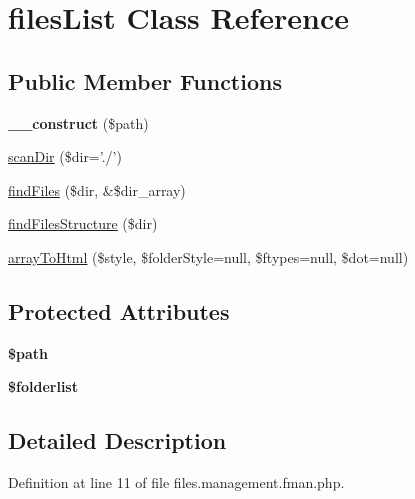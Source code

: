 \hypertarget{classfiles_list}{\section{files\-List Class Reference}
\label{classfiles_list}
}
\subsection*{Public Member Functions}
\begin{DoxyCompactItemize}
\item 
\hypertarget{classfiles_list_a03853ceaa393e487835b287de58aba5a}{{\bfseries \-\_\-\-\_\-construct} (\$path)}\label{classfiles_list_a03853ceaa393e487835b287de58aba5a}

\item 
\hyperlink{classfiles_list_a3593ec13e3e24737585badced66b43e1}{scan\-Dir} (\$dir='./')
\item 
\hyperlink{classfiles_list_a7ccfe88b459f36381d83b8fd039999c8}{find\-Files} (\$dir, \&\$dir\-\_\-array)
\item 
\hyperlink{classfiles_list_ac08cf4a0b3b018e45d7d9eee5f6e1028}{find\-Files\-Structure} (\$dir)
\item 
\hyperlink{classfiles_list_ab39d896ae81da27aff1c1611d2ec221e}{array\-To\-Html} (\$style, \$folder\-Style=null, \$ftypes=null, \$dot=null)
\end{DoxyCompactItemize}
\subsection*{Protected Attributes}
\begin{DoxyCompactItemize}
\item 
\hypertarget{classfiles_list_a0a4baf0b22973c07685c3981f0d17fc4}{{\bfseries \$path}}\label{classfiles_list_a0a4baf0b22973c07685c3981f0d17fc4}

\item 
\hypertarget{classfiles_list_ae6c874521ea9958e89e89f1d4d6e01d5}{{\bfseries \$folderlist}}\label{classfiles_list_ae6c874521ea9958e89e89f1d4d6e01d5}

\end{DoxyCompactItemize}


\subsection{Detailed Description}


Definition at line 11 of file files.\-management.\-fman.\-php.



